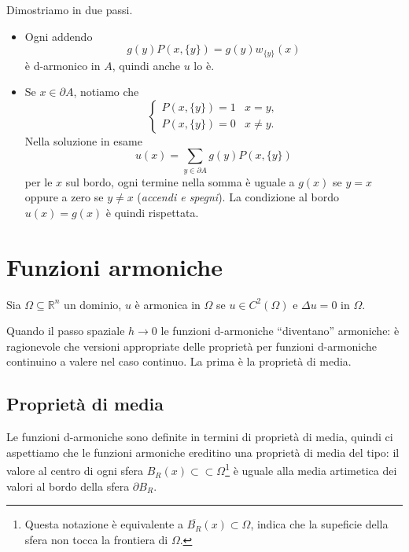\documentclass[10pt,a4paper,twoside,openright]{book}
\begin{document}
\begin{dimostrazione} Dimostriamo in due passi.
	\begin{itemize}
		\item Ogni addendo
		\begin{equation*}
			g(y) P(x,\{y\}) =g(y) w_{\{y\}}(x)
		\end{equation*}
		è d-armonico in $A$, quindi anche $u$ lo è.

		\item Se $x\in \partial A$, notiamo che
		\begin{equation*}
			\begin{cases}
				P(x,\{y\}) =1 & x=y,     \\
				P(x,\{y\}) =0 & x\neq y.
			\end{cases}
		\end{equation*}
		Nella soluzione in esame
		\begin{equation*}
			u(x) =\sum _{y\in \partial A} g(y) P(x,\{y\})
		\end{equation*}
		per le $x$ sul bordo, ogni termine nella somma è uguale a $g(x)$ se $y=x$ oppure a zero se $\displaystyle y\neq x$ (\textit{accendi e spegni}).
		La condizione al bordo $u(x) =g(x)$ è quindi rispettata.
	\end{itemize}
\end{dimostrazione}
\section{Funzioni armoniche}

Sia $\displaystyle \Omega \subseteq \mathbb{R}^{n}$ un dominio, $\displaystyle u$ è armonica in $\displaystyle \Omega $ se $\displaystyle u\in C^{2}(\Omega)$ e $\displaystyle \Delta u=0$ in $\displaystyle \Omega $. 

Quando il passo spaziale $\displaystyle h\rightarrow 0$ le funzioni d-armoniche ``diventano'' armoniche: è ragionevole che versioni appropriate delle proprietà per funzioni d-armoniche continuino a valere nel caso continuo. La prima è la proprietà di media.
\subsection{Proprietà di media}

Le funzioni d-armoniche sono definite in termini di proprietà di media, quindi ci aspettiamo che le funzioni armoniche ereditino una proprietà di media del tipo: il valore al centro di ogni sfera $\displaystyle B_{R}(x) \subset \subset \Omega $\footnote{Questa notazione è equivalente a $\displaystyle \overline{B_{R}}(x) \subset \Omega $, indica che la supeficie della sfera non tocca la frontiera di $\displaystyle \Omega $.} è uguale alla media artimetica dei valori al bordo della sfera $\displaystyle \partial B_{R}$.
\end{document}

